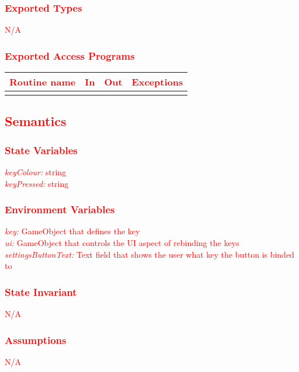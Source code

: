 \documentclass[12pt]{article}
\begin{document}
\subsubsection {\textcolor{red}{Exported Types}}
\textcolor{red}{N/A}

\subsubsection {\textcolor{red}{Exported Access Programs}}

\begin{tabular}{| l | l | l | l |}
\hline
\textcolor{red}{\textbf{Routine name}} & \textcolor{red}{\textbf{In}} & \textcolor{red}{\textbf{Out}} & \textcolor{red}{\textbf{Exceptions}}\\
\hline
& & & \\
\hline
\end{tabular}

\subsection {\textcolor{red}{Semantics}}

\subsubsection {\textcolor{red}{State Variables}}
\textcolor{red}{\textit{keyColour:} string}\\
\textcolor{red}{\textit{keyPressed:} string}

\subsubsection {\textcolor{red}{Environment Variables}}
\textcolor{red}{\textit{key:} GameObject that defines the key}\\
\textcolor{red}{\textit{ui:} GameObject that controls the UI aspect of rebinding the keys}\\
\textcolor{red}{\textit{settingsButtonText:} Text field that shows the user what key the button is binded to}

\subsubsection {\textcolor{red}{State Invariant}}
\textcolor{red}{N/A}

\subsubsection {\textcolor{red}{Assumptions}}
\textcolor{red}{N/A}
\end{document}

